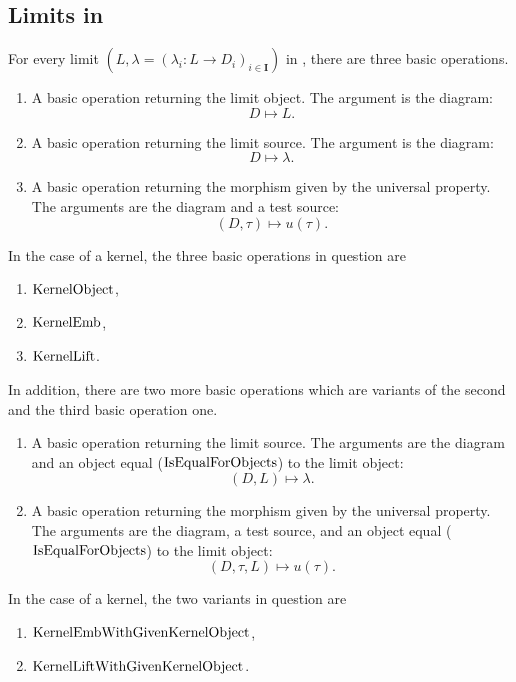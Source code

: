 \subsection{Limits in \CapPkg}

For every limit $\left(L, \lambda = ( \lambda_i: L \rightarrow D_i)_{i \in \mathbf{I}} \right)$ in \CapPkg, 
there are three basic operations.

\begin{enumerate}
 \item A basic operation returning the limit object. The argument is the diagram:
 \[
  D \mapsto L.
 \]
 \item A basic operation returning the limit source. The argument is the diagram:
 \[
  D \mapsto \lambda.
 \]
 \item A basic operation returning the morphism given by the universal property. 
       The arguments are the diagram and a test source:
 \[
  ( D, \tau ) \mapsto u(\tau).
 \]
\end{enumerate}

\begin{example}
 In the case of a kernel, the three basic operations in question are
 \begin{enumerate}
  \item $\mathrm{KernelObject}$,
  \item $\mathrm{KernelEmb}$,
  \item $\mathrm{KernelLift}$.
 \end{enumerate} 
\end{example}

In addition, there are two more basic operations which are variants of the second
and the third basic operation one.

\begin{enumerate}
 \item A basic operation returning the limit source. The arguments are the diagram
       and an object equal ($\mathrm{IsEqualForObjects}$) to the limit object:
       \[
        ( D, L ) \mapsto \lambda.
       \]
  \item A basic operation returning the morphism given by the universal property.
        The arguments are the diagram, a test source, and an object equal ($\mathrm{IsEqualForObjects}$)
        to the limit object:
        \[
         ( D, \tau, L ) \mapsto u( \tau ).
        \]
\end{enumerate}

\begin{example}
 In the case of a kernel, the two variants in question are
 \begin{enumerate}
  \item $\mathrm{KernelEmbWithGivenKernelObject}$,
  \item $\mathrm{KernelLiftWithGivenKernelObject}$.
 \end{enumerate} 
\end{example}

